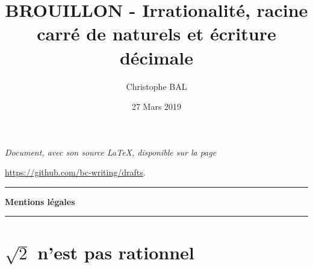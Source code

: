 \documentclass[12pt]{amsart}
\begin{document}
\title{BROUILLON - Irrationalité, racine carré de naturels et écriture décimale}
\author{Christophe BAL}
\date{27 Mars 2019}

\maketitle

\begin{center}
	\itshape
	Document, avec son source \LaTeX, disponible sur la page
	
	\url{https://github.com/bc-writing/drafts}.
\end{center}


\bigskip


\begin{center}
	\hrule\vspace{.3em}
	{
		\fontsize{1.35em}{1em}\selectfont
		\textbf{Mentions \og légales \fg}
	}
			
	\vspace{0.45em}
	\doclicenseThis
	\hrule
\end{center}


\setcounter{tocdepth}{1}
\tableofcontents



\section{$\sqrt2$ n'est pas rationnel}




%
%
%
%
%
%
%
%
%
%
%
%
%
%
%
%
%
%
\end{document}
